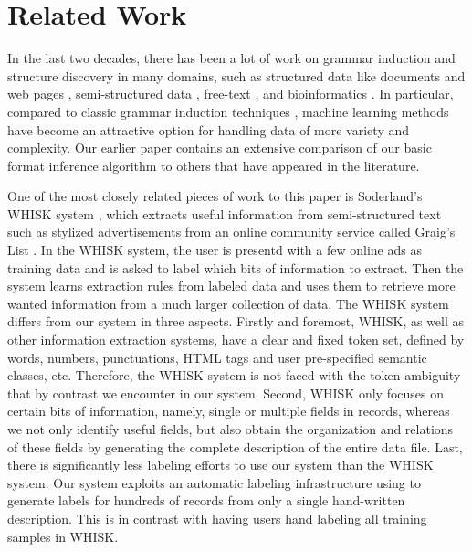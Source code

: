 \section{Related Work}\label{sec:related}

In the last two decades, there has been a lot of work on
grammar induction and structure discovery in many domains,
such as structured data like \xml{} documents
\cite{bex+:dtd-inference,garofalakis+:xtract} and web pages
\cite{kushmerick-phd1997,arasu+:sigmod03,hong:thesis}, semi-structured data
\cite{soderland:whisk,Pinto+:texttables}, free-text 
\cite{borkar+:text-segmentation,Heeman99:speech,Chen95bayesiangrammar}, and
bioinformatics \cite{kulp96generalized}. In particular, compared to classic 
grammar induction techniques
\cite{vidal:gisurvey,gold:inference,angluin:revesible-language-inference},
machine learning methods have become an attractive option for handling
data of more variety and complexity. Our earlier paper contains an
extensive comparison of our basic format inference
algorithm to others that have appeared in the literature.

One of the most closely related pieces of work to this paper is Soderland's WHISK
system \cite{soderland:whisk}, which extracts useful information from
semi-structured text such as stylized advertisements from an online community
service called Graig's List \cite{craigslist}.
In the WHISK system, the user is presentd with a few online ads as training data 
and is asked to label which bits of information to extract. Then the system learns
extraction rules from labeled data and uses them to retrieve more wanted
information from a much larger collection of data. 
The WHISK system differs from our system in three aspects. 
Firstly and foremost, WHISK, as well as other information extraction systems,
have a clear and fixed token set, defined by words, numbers, punctuations, 
HTML tags and user pre-specified semantic classes, etc. 
Therefore, the WHISK system is not faced with the token ambiguity that 
by contrast we encounter in our system. Second, WHISK only focuses on certain bits of
information, namely, single or multiple fields in records, 
whereas we not only identify useful fields, but also obtain the 
organization and relations of these fields by generating the complete 
description of the entire data file. 
Last, there is significantly less labeling efforts to use our system than 
the WHISK system. Our system exploits an automatic labeling 
infrastructure using \pads{} to generate
labels for hundreds of records from only a single hand-written description.
This is in contrast with having users hand labeling all training samples
in WHISK.

